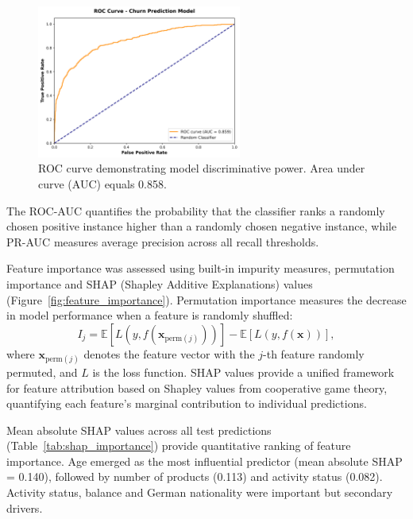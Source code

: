 \documentclass[12pt]{article}
\begin{document}
\begin{figure}[H]
\centering
\includegraphics[width=0.6\textwidth]{../img/17_roc_curve.png}
\caption{ROC curve demonstrating model discriminative power. Area under curve (AUC) equals 0.858.}
\label{fig:roc_curve}
\end{figure}

The ROC-AUC quantifies the probability that the classifier ranks a randomly chosen positive instance higher than a randomly chosen negative instance, while PR-AUC measures average precision across all recall thresholds.

Feature importance was assessed using built‑in impurity measures, permutation importance and SHAP (Shapley Additive Explanations) values (Figure~\ref{fig:feature_importance}). Permutation importance measures the decrease in model performance when a feature is randomly shuffled:
\[ I_j = \mathbb{E}[L(y, f(\mathbf{x}_{\text{perm}(j)}))] - \mathbb{E}[L(y, f(\mathbf{x}))], \]
where \(\mathbf{x}_{\text{perm}(j)}\) denotes the feature vector with the \(j\)-th feature randomly permuted, and \(L\) is the loss function. SHAP values provide a unified framework for feature attribution based on Shapley values from cooperative game theory, quantifying each feature's marginal contribution to individual predictions.

Mean absolute SHAP values across all test predictions (Table~\ref{tab:shap_importance}) provide quantitative ranking of feature importance. Age emerged as the most influential predictor (mean absolute SHAP = 0.140), followed by number of products (0.113) and activity status (0.082). Activity status, balance and German nationality were important but secondary drivers.
\end{document}
